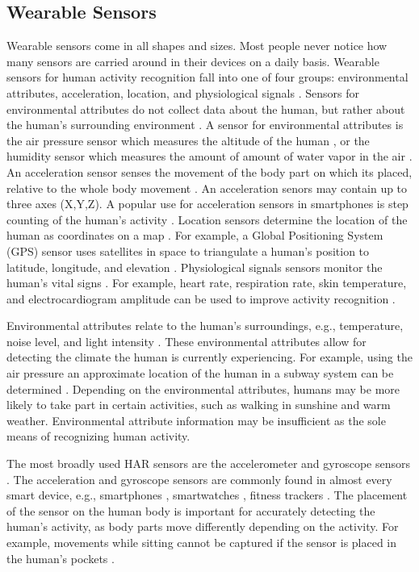 \subsection{Wearable Sensors}
Wearable sensors come in all shapes and sizes. Most people never notice how many sensors are carried around in their devices on a daily basis. Wearable sensors for human activity recognition fall into one of four groups: environmental attributes, acceleration, location, and physiological signals \cite{Lara2013}. Sensors for environmental attributes do not collect data about the human, but rather about the human's surrounding environment \cite{Juha2006}. A sensor for environmental attributes is the air pressure sensor which measures the altitude of the human \cite{5559476}, or the humidity sensor which measures the amount of amount of water vapor in the air \cite{Qin2007}. An acceleration sensor senses the movement of the body part on which its placed, relative to the whole body movement \cite{Maurer2006}. An acceleration senors may contain up to three axes (X,Y,Z). A popular use for acceleration sensors in smartphones is step counting of the human's activity \cite{Brajdic:2013}. Location sensors determine the location of the human as coordinates on a map \cite{Quddus2003}. For example, a Global Positioning System (GPS) sensor uses satellites in space to triangulate a human's position to latitude, longitude, and elevation \cite{hofmann2012global}. Physiological signals sensors monitor the human's vital signs \cite{Yin:2008}. For example, heart rate, respiration rate, skin temperature, and electrocardiogram amplitude can be used to improve activity recognition \cite{Lara2012}.
\par Environmental attributes relate to the human's surroundings, e.g., temperature, noise level, and light intensity \cite{Maurer2006}. These environmental attributes allow for detecting the climate the human is currently experiencing. For example, using the air pressure an approximate location of the human in a subway system can be determined \cite{van2017subwayapps}. Depending on the environmental attributes, humans may be more likely to take part in certain activities, such as walking in sunshine and warm weather. Environmental attribute information may be insufficient as the sole means of recognizing human activity.
\par The most broadly used HAR sensors are the accelerometer and gyroscope sensors \cite{Lara2013}. The acceleration and gyroscope sensors are commonly found in almost every smart device, e.g., smartphones \cite{5560598}, smartwatches \cite{Shen:2016}, fitness trackers \cite{Kaewkannate2016}. The placement of the sensor on the human body is important for accurately detecting the human's activity, as body parts move differently depending on the activity. For example, movements while sitting cannot be captured if the sensor is placed in the human's pockets \cite{Maurer2006}.
